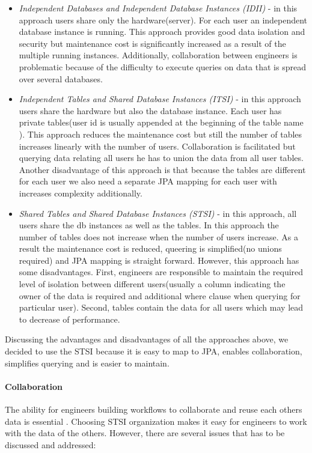 \documentclass[a4paper, notitlepage]{article}
\begin{document}
\begin{itemize}
	\item \textit{Independent Databases and Independent Database Instances (IDII)} - in this approach users share only the hardware(server). For each user an independent database instance is running. This approach provides good data isolation and security but maintenance cost is significantly increased as a result of the multiple running instances. Additionally, collaboration between engineers is problematic because of the difficulty to execute queries on data that is spread over several databases.  
	
	\item \textit{Independent Tables and Shared Database Instances (ITSI)} - in this approach users share the hardware but also the database instance. Each user has private tables(user id is usually appended at the beginning of the table name \cite{Hui}). This approach reduces the maintenance cost but still the number of tables increases linearly with the number of users. Collaboration is facilitated but querying data relating all users he has to union the data from all user tables. Another disadvantage of this approach is that because the tables are different for each user we also need a separate JPA mapping for each user with increases complexity additionally.
	
	\item \textit{Shared Tables and Shared Database Instances (STSI)} - in this approach, all users share the db instances as well as the tables. In this approach the number of tables does not increase when the number of users increase. As a result the maintenance cost is reduced, queering is simplified(no unions required) and JPA mapping is straight forward. However, this approach has some disadvantages. First, engineers are responsible to maintain the required level of isolation between different users(usually a column indicating the owner of the data is required and additional where clause when querying for particular user). Second, tables contain the data for all users which may lead to decrease of performance.
	
\end{itemize}

Discussing the advantages and disadvantages of all the approaches above, we decided to use the STSI because it is easy to map to JPA, enables collaboration, simplifies querying and is easier to maintain.    

\paragraph{Collaboration}
The ability for engineers building workflows to collaborate and reuse each others data is essential \cite{Lu}. Choosing STSI organization makes it easy for engineers to work with the data of the others. However, there are several issues that has to be discussed and addressed:
\end{document}
